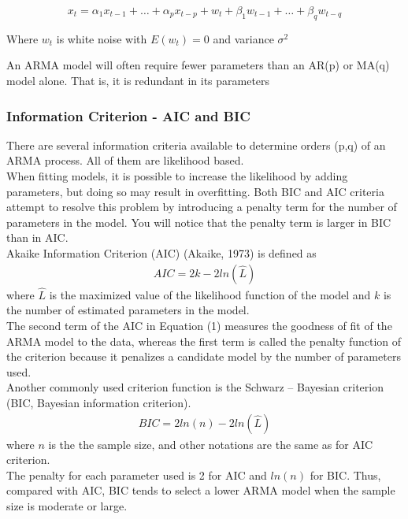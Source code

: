 $$x_t=\alpha_1x_{t-1}+…+\alpha_px_{t-p}+w_t+\beta_1w_{t-1}+…+\beta_qw_{t-q}$$ 

Where $w_t$ is white noise with $E(w_t)=0$ and variance $\sigma^2$

An ARMA model will often require fewer parameters than an AR(p) or MA(q) model alone. That is, it is redundant in its parameters

		\subsubsection {Information Criterion - AIC and BIC}

There are several information criteria available to determine orders (p,q) of an ARMA process. All of them are likelihood based. \\
When fitting models, it is possible to increase the likelihood by adding parameters, but doing so may result in overfitting. Both BIC and AIC criteria attempt to resolve this problem by introducing a penalty term for the number of parameters in the model. You will notice that the penalty term is larger in BIC than in AIC. \\
Akaike Information Criterion (AIC) (Akaike, 1973) is defined as
\begin{align}
AIC = 2k - 2ln(\hat{L})
\end{align}
where $\hat{L}$ is the maximized value of the likelihood function of the model and $k$ is  the number of estimated parameters in the model.
\\
The second term of the AIC in Equation (1) measures the
goodness of fit of the ARMA model to the data, whereas the first term is called the penalty function of the criterion because it penalizes a candidate model by the number of parameters used.
\\
Another  commonly  used  criterion  function  is  the  Schwarz – Bayesian  criterion (BIC, Bayesian information criterion).
\begin{align}
BIC = 2ln(n) - 2ln(\hat{L})
\end{align}
where $n$ is the the sample size, and other notations are the same as for AIC criterion.
\\
The penalty for each parameter used is 2 for AIC and $ln(n)$ for BIC.
Thus, compared with AIC, BIC tends to select a lower ARMA model when the sample size is moderate or large.

